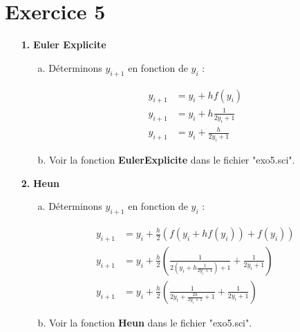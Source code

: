 \documentclass[12pt, letterpaper]{article}
\begin{document}
\section*{Exercice 5}

\begin{enumerate}

\item[\textbf{1.}]\textbf{Euler Explicite}

\begin{enumerate}

\item[a.] Déterminons $y_{i+1}$ en fonction de $y_i$ :

  \begin{equation*}
    \begin{split}
      y_{i+1} & = y_i + h f(y_i) \\
      y_{i+1} & = y_i + h \frac{1}{2y_i + 1} \\
      y_{i+1} & = y_i + \frac{h}{2y_i + 1}
    \end{split}
  \end{equation*}

\item[b.] Voir la fonction \textbf{EulerExplicite} dans le fichier "exo5.sci".
  
\end{enumerate}

\item[\textbf{2.}] \textbf{Heun}

\begin{enumerate}

\item[a.] Déterminons $y_{i+1}$ en fonction de $y_i$ :

  \begin{equation*}
    \begin{split}
      y_{i+1} & = y_i + \frac{h}{2} (f(y_i + h f(y_i)) + f(y_i)) \\
      y_{i+1} & = y_i + \frac{h}{2} \left(\frac{1}{2 \left(y_i + h \frac{1}{2y_i
          + 1}\right) + 1} + \frac{1}{2y_i + 1}\right) \\
      y_{i+1} & = y_i + \frac{h}{2} \left(\frac{1}{2y_i + \frac{2h}{2y_i
          + 1} + 1} + \frac{1}{2y_i + 1}\right)
    \end{split}
  \end{equation*}

\item[b.] Voir la fonction \textbf{Heun} dans le fichier "exo5.sci".


\end{enumerate}
\end{enumerate}
\end{document}
